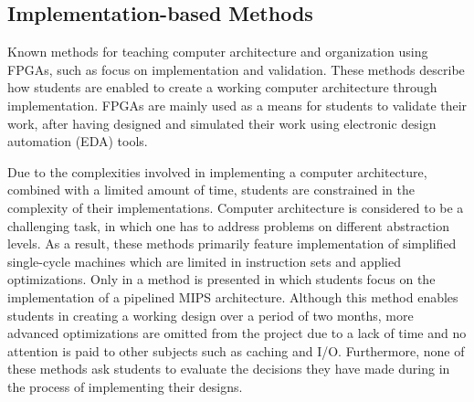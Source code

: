 \documentclass[openright]{template/uva-bachelor-thesis}
\begin{document}
\subsection{Implementation-based Methods}
Known methods for teaching computer architecture and organization using FPGAs, such as \cite{paharsingh2009novel, el2011teaching, nakano2008processor, al2007teaching, kellett2012project, jansen2014every, pereira2012basic, cifredo2015computer, lee2012pipelined} focus on implementation and validation. These methods describe how students are enabled to create a working computer architecture through implementation. FPGAs are mainly used as a means for students to validate their work, after having designed and simulated their work using electronic design automation (EDA) tools. 

Due to the complexities involved in implementing a computer architecture, combined with a limited amount of time, students are constrained in the complexity of their implementations. Computer architecture is considered to be a challenging task, in which one has to address problems on different abstraction levels. As a result, these methods primarily feature implementation of simplified single-cycle machines which are limited in instruction sets and applied optimizations. Only in \cite{lee2012pipelined} a method is presented in which students focus on the implementation of a pipelined MIPS architecture. Although this method enables students in creating a working design over a period of two months, more advanced optimizations are omitted from the project due to a lack of time and no attention is paid to other subjects such as caching and I/O. Furthermore, none of these methods ask students to evaluate the decisions they have made during in the process of implementing their designs. 

\end{document}
